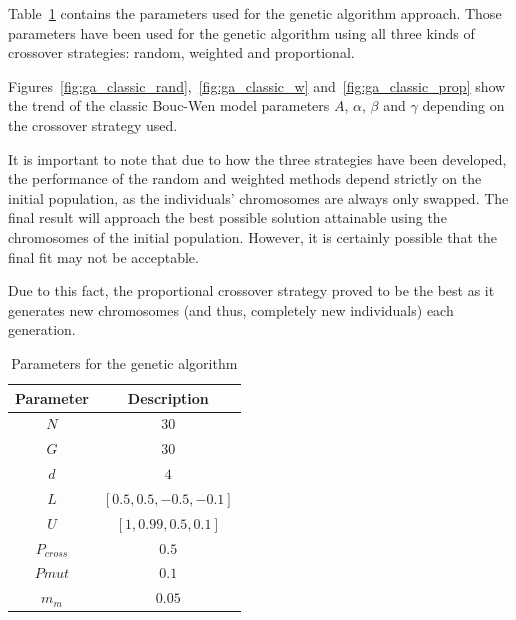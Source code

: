 Table~\ref{tab:ga_classic_params} contains the parameters used
for the genetic algorithm approach. Those parameters have been used for
the genetic algorithm using all three kinds of crossover strategies:
random, weighted and proportional.

Figures~\ref{fig:ga_classic_rand},~\ref{fig:ga_classic_w}
and~\ref{fig:ga_classic_prop} show the trend of the classic Bouc-Wen model
parameters $A$, $\alpha$, $\beta$ and $\gamma$ depending on the
crossover strategy used.

It is important to note that due to how the three strategies have been developed,
the performance of the random and weighted methods depend strictly on
the initial population, as the individuals' chromosomes are always only swapped.
The final result will approach the best possible solution attainable
using the chromosomes of the initial population. 
However, it is certainly possible that the final fit may not be acceptable.

Due to this fact, the proportional crossover strategy proved to be the best
as it generates new chromosomes (and thus, completely new individuals)
each generation.

\begin{table}
	\centering
	\begin{tabular}{c c}
		\toprule
		\textbf{Parameter} & \textbf{Description} \\ \toprule
		$N$			& $30$ \\
		$G$			& $30$ \\
		$d$			& $4$  \\
		$L$			& $\left[0.5, 0.5, -0.5, -0.1\right]$ \\
		$U$			& $\left[1, 0.99, 0.5, 0.1\right]$ \\ 
		$P_{cross}$	& $0.5$ \\
		$P{mut}$	& $0.1$ \\
		$m_m$		& $0.05$ \\	\bottomrule
	\end{tabular}
	\caption{Parameters for the genetic algorithm}
	\label{tab:ga_classic_params}
\end{table}


